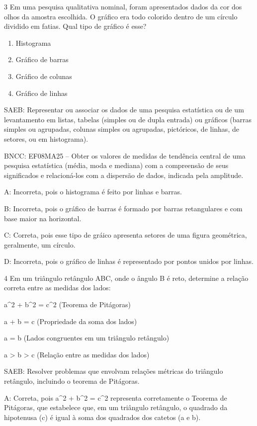 {\num{3} Em uma pesquisa qualitativa nominal, foram apresentados dados da cor
dos olhos da amostra escolhida. O gráfico era todo colorido dentro de um
círculo dividido em fatias. Qual tipo de gráfico é esse?

\begin{enumerate}
\def\labelenumi{\alph{enumi}.}
\item
  Histograma
\item
  Gráfico de barras
\item
  Gráfico de colunas
\item
  Gráfico de linhas~
\end{enumerate}

SAEB: Representar ou associar os dados de uma pesquisa estatística ou de
um levantamento em listas, tabelas (simples ou de dupla entrada) ou
gráficos (barras simples ou agrupadas, colunas simples ou agrupadas,
pictóricos, de linhas, de setores, ou em histograma).

BNCC: EF08MA25 -- Obter os valores de medidas de tendência central de
uma pesquisa estatística (média, moda e mediana) com a compreensão de
seus significados e relacioná-los com a dispersão de dados, indicada
pela amplitude.

A: Incorreta, pois o histograma é feito por linhas e barras.

B: Incorreta, pois o gráfico de barras é formado por barras retangulares
e com base maior na horizontal.

C: Correta, pois esse tipo de gráico apresenta setores de uma figura
geométrica, geralmente, um círculo.

D: Incorreta, pois o gráfico de linhas é representado por pontos unidos
por linhas.

\num{4} Em um triângulo retângulo ABC, onde o ângulo B é reto, determine a
relação correta entre as medidas dos lados:
\item a^2 + b^2 = c^2 (Teorema de Pitágoras)
\item a + b = c (Propriedade da soma dos lados)
\item a = b (Lados congruentes em um triângulo retângulo)
\item a \textgreater{} b \textgreater{} c (Relação entre as medidas dos
lados)

SAEB: Resolver problemas que envolvam relações métricas do triângulo
retângulo, incluindo o teorema de Pitágoras.

A: Correta, pois a^2 + b^2 = c^2 representa corretamente o Teorema de
Pitágoras, que estabelece que, em um triângulo retângulo, o quadrado da
hipotenusa (c) é igual à soma dos quadrados dos catetos (a e b).

}
